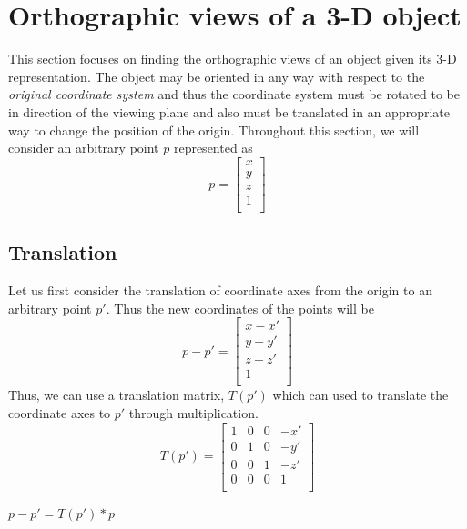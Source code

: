 \documentclass{article}
\begin{document}
\section{Orthographic views of a 3-D object}
This section focuses on finding the orthographic views of an object given its 3-D representation. The object may be oriented in any way with respect to the \emph{original coordinate system} and thus the coordinate system must be rotated to be in direction of the viewing plane and also must be translated in an appropriate way to change the position of the origin. Throughout this section, we will consider an arbitrary point $p$ represented as 
\[p = \begin{bmatrix}
x\\
y\\
z\\
1\\
\end{bmatrix}\]

\subsection{Translation}
Let us first consider the translation of coordinate axes from the origin to an arbitrary point $p'$. Thus the new coordinates of the points will be \[p - p' = \begin{bmatrix}
x-x'\\
y-y'\\
z-z'\\
1\\
\end{bmatrix}\]
Thus, we can use a translation matrix, $T(p')$ which can used to translate the coordinate axes to $p'$ through multiplication. 
\[T(p') = \begin{bmatrix}
1&0&0&-x'\\
0&1&0&-y'\\
0&0&1&-z'\\
0&0&0&1\\
\end{bmatrix}\]
\begin{center}
    $p-p' = T(p')*p$
\end{center}
\end{document}
